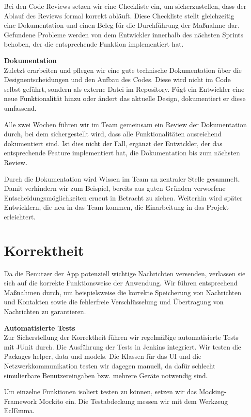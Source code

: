 Bei den Code Reviews setzen wir eine Checkliste ein, um sicherzustellen, dass der Ablauf des Reviews formal korrekt abläuft. Diese Checkliste stellt gleichzeitig eine Dokumentation und einen Beleg für die Durchführung der Maßnahme dar. Gefundene Probleme werden von dem Entwickler innerhalb des nächsten Sprints behoben, der die entsprechende Funktion implementiert hat.
    
\textbf{Dokumentation}\\
Zuletzt erarbeiten und pflegen wir eine gute technische Dokumentation über die Designentscheidungen und den Aufbau des Codes. Diese wird nicht im Code selbst geführt, sondern als externe Datei im Repository. Fügt ein Entwickler eine neue Funktionalität hinzu oder ändert das aktuelle Design, dokumentiert er diese umfassend.
    
Alle zwei Wochen führen wir im Team gemeinsam ein Review der Dokumentation durch, bei dem sichergestellt wird, dass alle Funktionalitäten ausreichend dokumentiert sind. Ist dies nicht der Fall, ergänzt der Entwickler, der das entsprechende Feature implementiert hat, die Dokumentation bis zum nächsten Review.
    
Durch die Dokumentation wird Wissen im Team an zentraler Stelle gesammelt. Damit verhindern wir zum Beispiel, bereits aus guten Gründen verworfene Entscheidungsmöglichkeiten erneut in Betracht zu ziehen. Weiterhin wird später Entwicklern, die neu in das Team kommen, die Einarbeitung in das Projekt erleichtert.

\section{Korrektheit}
Da die Benutzer der App potenziell wichtige Nachrichten versenden, verlassen sie sich auf die korrekte Funktionsweise der Anwendung. Wir führen entsprechend Maßnahmen durch, um beispielsweise die korrekte Speicherung von Nachrichten und Kontakten sowie die fehlerfreie Verschlüsselung und Übertragung von Nachrichten zu garantieren.
  
\textbf{Automatisierte Tests}\\
Zur Sicherstellung der Korrektheit führen wir regelmäßige automatisierte Tests mit JUnit durch. Die Ausführung der Tests in Jenkins integriert. Wir testen die Packages helper, data und models. Die Klassen für das UI und die Netzwerkkommunikation testen wir dagegen manuell, da dafür schlecht simulierbare Benutzereingaben bzw. mehrere Geräte notwendig sind.
    
Um einzelne Funktionen isoliert testen zu können, setzen wir das Mocking-Framework Mockito ein. Die Testabdeckung messen wir mit dem Werkzeug EclEmma.

